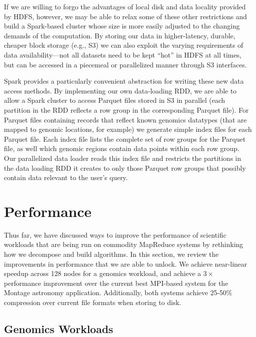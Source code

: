 \documentclass{acm_proc_article-sp}
\begin{document}
If we are willing to forgo the advantages of local disk and data locality provided by HDFS, however, we
may be able to relax some of these other restrictions and build a Spark-based cluster whose size is more
easily adjusted to the changing demands of the computation. By storing our data in higher-latency,
durable, cheaper block storage (e.g., S3) we can also exploit the varying requirements of data \linebreak
availability---not all datasets need to be kept ``hot'' in HDFS at all times, but can be accessed in a
piecemeal or parallelized manner through S3 interfaces.

Spark provides a particularly convenient abstraction for writing these new data access methods.  By
implementing our own data-loading RDD, we are able to allow a Spark cluster to access Parquet files
stored in S3 in parallel (each partition in the RDD reflects a row group in the corresponding Parquet file).
For Parquet files containing records that reflect known genomics datatypes (that are mapped to genomic
locations, for example) we generate simple index files for each Parquet file.  Each index file lists the
complete set of row groups for the Parquet file, as well which genomic regions contain data points within
each row group.  Our parallelized data loader reads this index file and restricts the partitions in the data
loading RDD it creates to only those Parquet row groups that possibly contain data relevant to the
user's query.

\section{Performance}
\label{sec:performance}

Thus far, we have discussed ways to improve the performance of scientific workloads that are
being run on commodity MapReduce systems by rethinking how we decompose and build algorithms.
In this section, we review the improvements in performance that we are able to unlock. We achieve
near-linear speedup across 128 nodes for a genomics workload, and achieve a $3\times$ performance
improvement over the current best MPI-based system for the Montage astronomy application.
Additionally, both systems achieve 25-50\% compression over current file formats when storing to disk.

\subsection{Genomics Workloads}
\label{sec:genomics-performance}
\end{document}
